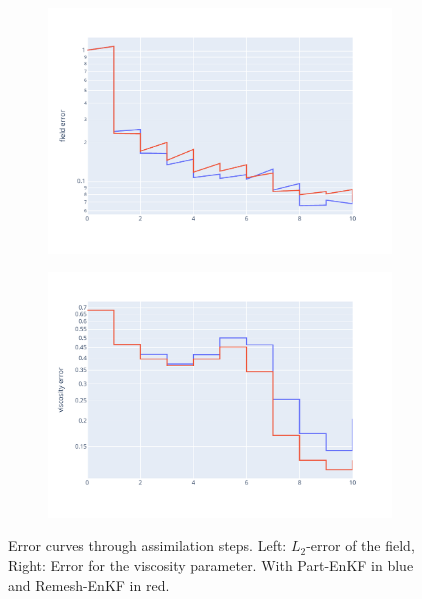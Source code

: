 \begin{figure}[htbp]
	\centering
	\begin{subfigure}{0.49\linewidth}
		\includegraphics*[width=\linewidth]{images/app2d/field_error_w_assim.pdf}
	\end{subfigure}
	\begin{subfigure}{0.49\linewidth}
		\includegraphics*[width=\linewidth]{images/app2d/viscosity_error_w_assim.pdf}
	\end{subfigure}
	\caption{Error curves through assimilation steps. Left: \(L_2\)-error of the field, Right: Error for the viscosity parameter. With Part-EnKF in blue and Remesh-EnKF in red.}
	\label{fig:assim_time}
\end{figure}

